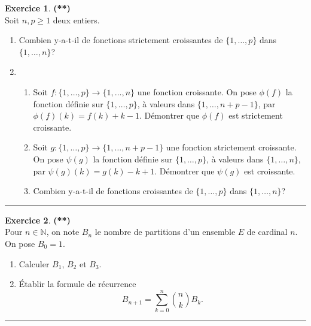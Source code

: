 \documentclass[a4paper,11pt]{article}
\theoremstyle{definition}
\newtheorem{exo}{Exercice} %
\begin{document}
\begin{minipage}{1\linewidth}\begin{minipage}[c]{0.48\linewidth}\raggedright
		
		\begin{exo}\textbf{(**)}\quad\\[0.2cm]
			Soit $n,p\geq 1$ deux entiers.
			\begin{enumerate}
				\item Combien y-a-t-il de fonctions strictement croissantes de $\{1,\dots,p\}$ dans $\{1,\dots,n\}$?
				\item \begin{enumerate}
					\item Soit $f:\{1,\dots,p\}\to\{1,\dots,n\}$ une fonction croissante. On pose $\phi(f)$ la fonction définie sur $\{1,\dots,p\}$, à valeurs dans $\{1,\dots,n+p-1\}$, par $\phi(f)(k)=f(k)+k-1$. Démontrer que $\phi(f)$ est strictement croissante.
					\item Soit $g:\{1,\dots,p\}\to\{1,\dots,n+p-1\}$ une fonction strictement croissante. On pose $\psi(g)$ la fonction définie sur $\{1,\dots,p\}$, à valeurs dans $\{1,\dots,n\}$, par $\psi(g)(k)=g(k)-k+1$. Démontrer que $\psi(g)$ est croissante.
					\item Combien y-a-t-il de fonctions croissantes de $\{1,\dots,p\}$ dans $\{1,\dots,n\}$?
				\end{enumerate}
			\end{enumerate}\centering\rule{1\linewidth}{0.6pt}\end{exo}
		
				\begin{exo}\textbf{(**)}\quad\\[0.2cm]
			Pour $n\in\mathbb N$, on note $B_n$ le nombre de partitions d'un ensemble $E$ de cardinal $n$. On pose $B_0=1$.
			\begin{enumerate}
				\item Calculer $B_1$, $B_2$ et $B_3$.
				\item \'Etablir la formule de récurrence 
				$$B_{n+1}=\sum_{k=0}^n \binom nk B_k.$$
			\end{enumerate}
			
			\centering\rule{1\linewidth}{0.6pt}\end{exo}
		
		
	\end{minipage}\hfill\vrule\hfill\begin{minipage}[c ]{0.48\linewidth}\raggedright
		

\end{minipage}
\end{minipage}
\end{document}
